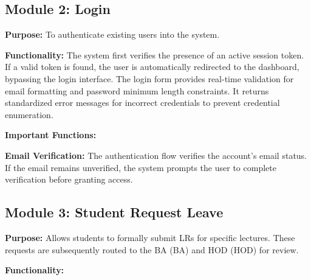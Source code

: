 \subsection{Module 2: Login}

\textbf{Purpose:}
To authenticate existing users into the system.

\textbf{Functionality:}
The system first verifies the presence of an active session token. If a valid token is found, the user is automatically redirected to the dashboard, bypassing the login interface. The login form provides real-time validation for email formatting and password minimum length constraints. It returns standardized error messages for incorrect credentials to prevent credential enumeration.

\textbf{Important Functions:}

\textbf{Email Verification:}
The authentication flow verifies the account's email status. If the email remains unverified, the system prompts the user to complete verification before granting access.

\subsection{Module 3: Student Request Leave}
\textbf{Purpose:}
Allows students to formally submit LRs for specific lectures. These requests are subsequently routed to the BA (BA) and HOD (HOD) for review.

\textbf{Functionality:}

